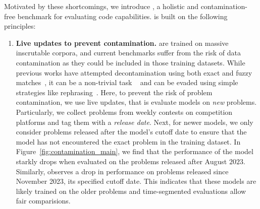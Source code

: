 Motivated by these shortcomings, we introduce \livecodebench{}, 
a holistic and contamination-free benchmark for evaluating code capabilities. 
\livecodebench{} is built on the following principles:
\begin{enumerate}
\itemsep-0.1em 
    \item \textbf{Live updates to prevent contamination.} 
    \llms{} are trained on massive inscrutable corpora, and current benchmarks 
    suffer from the risk of data contamination as they could be included in those training datasets.
    While previous works have attempted decontamination using both exact and fuzzy matches~\citep{li2023starcoder, li2023textbooks}, it can be a non-trivial task ~\citep{gemini15} and can be evaded using simple strategies like rephrasing~\citep{yang2023rethinking}.
    Here, to prevent the risk of problem contamination, we use live updates, 
    that is evaluate models on \textit{new} problems. 
    Particularly, we collect problems from weekly contests on competition platforms 
    and tag them with a \textit{release date}. 
    Next, for newer models, we only consider problems released after the model's cutoff date to ensure that the model has not encountered the exact problem in the training dataset.
    In Figure~\ref{fig:contamination_main}, we find that the performance of the \deepseek{} model starkly 
    drops when evaluated on the \leetcode{} problems released after August $2023$.  
    Similarly, \gptfouro{} observes a drop in performance on \leetcode{} problems released since November 2023, its specified cutoff date.
    This indicates that these models are likely trained on the older \leetcode{} problems and time-segmented evaluations allow fair comparisions.
    

\end{enumerate}
